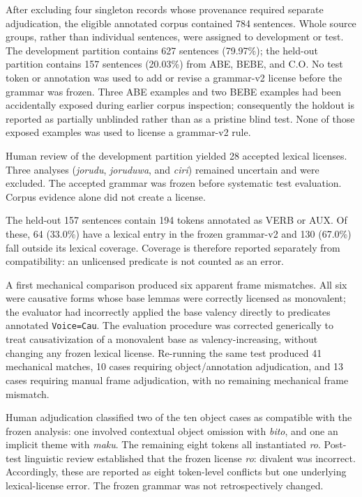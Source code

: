 \documentclass[11pt]{article}
\begin{document}
After excluding four singleton records whose provenance required separate
adjudication, the eligible annotated corpus contained 784 sentences. Whole
source groups, rather than individual sentences, were assigned to development
or test. The development partition contains 627 sentences (79.97\%); the
held-out partition contains 157 sentences (20.03\%) from ABE, BEBE, and C.O.
No test token or annotation was used to add or revise a grammar-v2 license
before the grammar was frozen. Three ABE examples and two BEBE examples had
been accidentally exposed during earlier corpus inspection; consequently the
holdout is reported as partially unblinded rather than as a pristine blind
test. None of those exposed examples was used to license a grammar-v2 rule.

Human review of the development partition yielded 28 accepted lexical licenses.
Three analyses (\textit{jorudu}, \textit{joruduwa}, and \textit{ciri}) remained
uncertain and were excluded. The accepted grammar was frozen before systematic
test evaluation. Corpus evidence alone did not create a license.

The held-out 157 sentences contain 194 tokens annotated as VERB or AUX. Of
these, 64 (33.0\%) have a lexical entry in the frozen grammar-v2 and 130
(67.0\%) fall outside its lexical coverage. Coverage is therefore reported
separately from compatibility: an unlicensed predicate is not counted as an
error.

A first mechanical comparison produced six apparent frame mismatches. All six
were causative forms whose base lemmas were correctly licensed as monovalent;
the evaluator had incorrectly applied the base valency directly to predicates
annotated \texttt{Voice=Cau}. The evaluation procedure was corrected
generically to treat causativization of a monovalent base as valency-increasing,
without changing any frozen lexical license. Re-running the same test produced
41 mechanical matches, 10 cases requiring object/annotation adjudication, and
13 cases requiring manual frame adjudication, with no remaining mechanical
frame mismatch.

Human adjudication classified two of the ten object cases as compatible with
the frozen analysis: one involved contextual object omission with
\textit{bito}, and one an implicit theme with \textit{maku}. The remaining
eight tokens all instantiated \textit{ro}. Post-test linguistic review
established that the frozen license \textit{ro}: divalent was incorrect.
Accordingly, these are reported as eight token-level conflicts but one
underlying lexical-license error. The frozen grammar was not retrospectively
changed.
\end{document}
